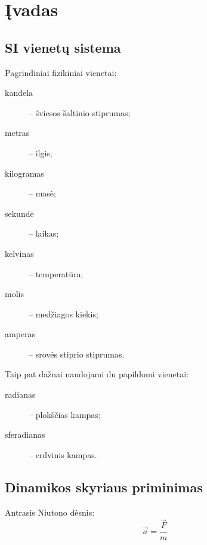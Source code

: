 \chapter{Įvadas}

\section{SI vienetų sistema}

Pagrindiniai fizikiniai vienetai:
\begin{description}
  \item[kandela] – šviesos šaltinio stiprumas;
  \item[metras] – ilgis;
  \item[kilogramas] – masė;
  \item[sekundė] – laikas;
  \item[kelvinas] – temperatūra;
  \item[molis] – medžiagos kiekis;
  \item[amperas] – srovės stiprio stiprumas.
\end{description}

Taip pat dažnai naudojami du papildomi vienetai:
\begin{description}
  \item[radianas] – plokščias kampas;
  \item[sferadianas] – erdvinis kampas.
\end{description}

\section{Dinamikos skyriaus priminimas}

Antrasis Niutono dėsnis:
\begin{equation*}
  \vec{a} = \frac{\vec{F}}{m}
\end{equation*}

